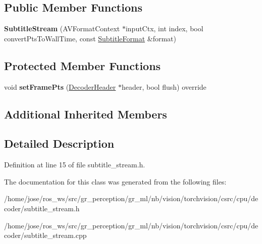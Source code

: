 \subsection*{Public Member Functions}
\begin{DoxyCompactItemize}
\item 
\mbox{\label{classffmpeg_1_1SubtitleStream_a8dec6ad568cfdeb46b695b08cc8a34cc}} 
{\bfseries Subtitle\+Stream} (A\+V\+Format\+Context $\ast$input\+Ctx, int index, bool convert\+Pts\+To\+Wall\+Time, const \hyperlink{structffmpeg_1_1SubtitleFormat}{Subtitle\+Format} \&format)
\end{DoxyCompactItemize}
\subsection*{Protected Member Functions}
\begin{DoxyCompactItemize}
\item 
\mbox{\label{classffmpeg_1_1SubtitleStream_a472113515cd261e29286e9a47ec02e0d}} 
void {\bfseries set\+Frame\+Pts} (\hyperlink{structffmpeg_1_1DecoderHeader}{Decoder\+Header} $\ast$header, bool flush) override
\end{DoxyCompactItemize}
\subsection*{Additional Inherited Members}


\subsection{Detailed Description}


Definition at line 15 of file subtitle\+\_\+stream.\+h.



The documentation for this class was generated from the following files\+:\begin{DoxyCompactItemize}
\item 
/home/jose/ros\+\_\+ws/src/gr\+\_\+perception/gr\+\_\+ml/nb/vision/torchvision/csrc/cpu/decoder/subtitle\+\_\+stream.\+h\item 
/home/jose/ros\+\_\+ws/src/gr\+\_\+perception/gr\+\_\+ml/nb/vision/torchvision/csrc/cpu/decoder/subtitle\+\_\+stream.\+cpp\end{DoxyCompactItemize}
